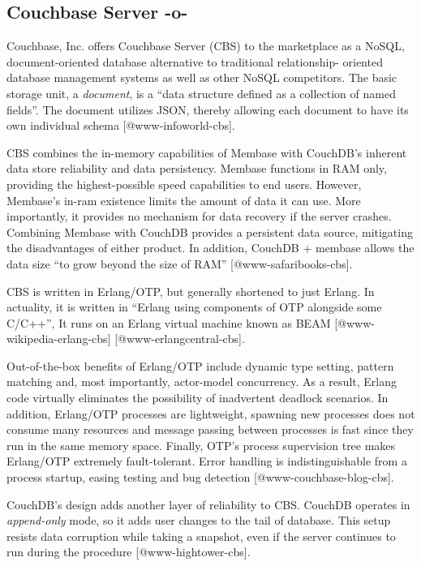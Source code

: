 \subsection{Couchbase Server -o-}


Couchbase, Inc. offers Couchbase Server (CBS) to the marketplace as a
NoSQL, document-oriented database alternative to traditional
relationship- oriented database management systems as well as other
NoSQL competitors.  The basic storage unit, a \textit{document}, is a ``data
structure defined as a collection of named fields''.  The document
utilizes JSON, thereby allowing each document to have its own
individual schema [@www-infoworld-cbs].

CBS combines the in-memory capabilities of Membase with CouchDB's
inherent data store reliability and data persistency.  Membase
functions in RAM only, providing the highest-possible speed
capabilities to end users.  However, Membase's in-ram existence limits
the amount of data it can use.  More importantly, it provides no
mechanism for data recovery if the server crashes.  Combining Membase
with CouchDB provides a persistent data source, mitigating the
disadvantages of either product.  In addition, CouchDB + membase
allows the data size ``to grow beyond the size of RAM''
 [@www-safaribooks-cbs].

CBS is written in Erlang/OTP, but generally shortened to just Erlang.
In actuality, it is written in ``Erlang using components of OTP
alongside some C/C++'', It runs on an Erlang virtual machine known as
BEAM [@www-wikipedia-erlang-cbs] [@www-erlangcentral-cbs].

Out-of-the-box benefits of Erlang/OTP include dynamic type setting,
pattern matching and, most importantly, actor-model concurrency.  As a
result, Erlang code virtually eliminates the possibility of
inadvertent deadlock scenarios.  In addition, Erlang/OTP processes are
lightweight, spawning new processes does not consume many resources
and message passing between processes is fast since they run in the
same memory space.  Finally, OTP's process supervision tree makes
Erlang/OTP extremely fault-tolerant.  Error handling is
indistinguishable from a process startup, easing testing and bug
detection [@www-couchbase-blog-cbs].

CouchDB's design adds another layer of reliability to CBS.  CouchDB
operates in \textit{append-only} mode, so it adds user changes to the tail of
database.  This setup resists data corruption while taking a snapshot,
even if the server continues to run during the
procedure [@www-hightower-cbs].


